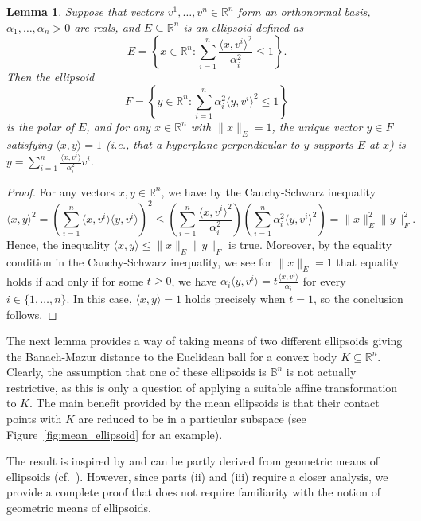 \documentclass[12pt,a4paper]{article}
\newtheorem{lem}[twr]{Lemma}
\theoremstyle{definition}
\newcommand\R{\mathbb{R}}
\newcommand\B{\mathbb{B}}
\begin{document}
\begin{lem}
\label{lem:polar_ellipsoid}
Suppose that vectors $v^1, \ldots, v^n \in \R^n$ form an orthonormal basis, $\alpha_1, \ldots, \alpha_n > 0$ are reals, and $E \subseteq \R^n$ is an ellipsoid defined as
$$E = \left\{ x \in \R^n : \sum_{i=1}^n \frac{\langle x, v^i \rangle^2}{\alpha_i^{2}} \leq 1 \right\}.$$
Then the ellipsoid
$$F = \left\{ y \in \R^n : \sum_{i=1}^n \alpha_i^{2} \langle y, v^i \rangle^2 \leq 1 \right\} $$
is the polar of $E$, and for any $x \in \R^n$ with $\|x\|_E=1$, the unique vector $y \in F$ satisfying $\langle x, y \rangle =1$ (i.e., that a hyperplane perpendicular to $y$ supports $E$ at $x$) is $y = \sum_{i=1}^n \frac{\langle x, v^i \rangle }{\alpha_i^2} v^i$.
\end{lem}
\begin{proof}
For any vectors $x,y \in \R^n$, we have by the Cauchy-Schwarz inequality
$$ \langle x, y \rangle^2 = \left ( \sum_{i=1}^{n} \langle x, v^i \rangle \langle y, v^i \rangle \right )^2 \leq \left ( \sum_{i=1}^n \frac{\langle x, v^i \rangle^2}{\alpha_i^{2}} \right ) \left ( \sum_{i=1}^n \alpha_i^{2} \langle y, v^i \rangle^2 \right ) = \|x\|_E^2 \|y\|_F^2. $$
Hence, the inequality $\langle x, y \rangle \leq \|x\|_E \|y\|_{F}$ is true. Moreover, by the equality condition in the Cauchy-Schwarz inequality, we see for $\| x \|_E = 1$ that equality holds if and only if for some $t \geq 0$, we have $\alpha_i \langle y, v^i \rangle = t \frac{\langle x, v^i \rangle}{\alpha_i}$ for every $i \in \{1, \ldots, n\}$. In this case, $\langle x, y \rangle = 1$ holds precisely when $t=1$, so the conclusion follows.
\end{proof}



The next lemma provides a way of taking means of two different ellipsoids giving the Banach-Mazur distance to the Euclidean ball for a convex body $K \subseteq \R^n$. Clearly, the assumption that one of these ellipsoids is $\B^n$ is not actually restrictive, as this is only a question of applying a suitable affine transformation to $K$. The main benefit provided by the mean ellipsoids is that their contact points with $K$ are reduced to be in a particular subspace (see Figure~\ref{fig:mean_ellipsoid} for an example).

The result is inspired by and can be partly derived from geometric means of ellipsoids (cf.~\cite{brandenberg,milmanrotem}). However, since parts (ii) and (iii) require a closer analysis, we provide a complete proof that does not require familiarity with the notion of geometric means of ellipsoids.
\end{document}
